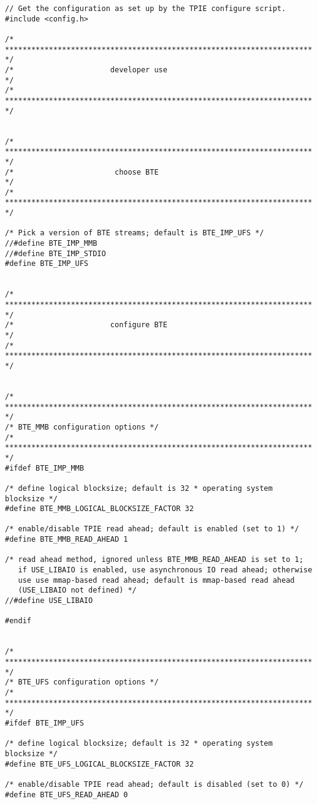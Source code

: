\begin{verbatim}
// Get the configuration as set up by the TPIE configure script.
#include <config.h>

/* ********************************************************************** */
/*                      developer use                                     */
/* ********************************************************************** */


/* ********************************************************************** */
/*                       choose BTE                                       */
/* ********************************************************************** */

/* Pick a version of BTE streams; default is BTE_IMP_UFS */
//#define BTE_IMP_MMB
//#define BTE_IMP_STDIO
#define BTE_IMP_UFS


/* ********************************************************************** */
/*                      configure BTE                                     */
/* ********************************************************************** */


/* ********************************************************************** */
/* BTE_MMB configuration options */
/* ********************************************************************** */
#ifdef BTE_IMP_MMB

/* define logical blocksize; default is 32 * operating system blocksize */
#define BTE_MMB_LOGICAL_BLOCKSIZE_FACTOR 32

/* enable/disable TPIE read ahead; default is enabled (set to 1) */
#define BTE_MMB_READ_AHEAD 1

/* read ahead method, ignored unless BTE_MMB_READ_AHEAD is set to 1;
   if USE_LIBAIO is enabled, use asynchronous IO read ahead; otherwise
   use use mmap-based read ahead; default is mmap-based read ahead
   (USE_LIBAIO not defined) */
//#define USE_LIBAIO

#endif


/* ********************************************************************** */
/* BTE_UFS configuration options */
/* ********************************************************************** */
#ifdef BTE_IMP_UFS

/* define logical blocksize; default is 32 * operating system blocksize */
#define BTE_UFS_LOGICAL_BLOCKSIZE_FACTOR 32

/* enable/disable TPIE read ahead; default is disabled (set to 0) */
#define BTE_UFS_READ_AHEAD 0


\end{verbatim}
